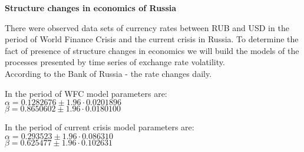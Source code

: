 \documentclass[12pt]{article}
\begin{document}
\begin{center}
\textbf{Structure changes in economics of Russia}
\end{center}

\bigskip
	There were observed data sets of currency rates between RUB and USD in the period of World Finance Crisis and the current crisis in Russia.
	To determine the fact of presence of structure changes in economics we will build the models of the processes presented by time series of exchange rate volatility.\\
	According to the Bank of Russia - the rate changes daily.
	
	In the period of WFC model parameters are:\\
	$\alpha = 0.1282676 \pm 1.96 \cdot 0.0201896$ \\
	$\beta = 0.8650602 \pm 1.96 \cdot 0.0180100$
	
	In the period of current crisis model parameters are:\\
	$\alpha = 0.293523 \pm 1.96 \cdot 0.086310$ \\
	$\beta =  0.625477 \pm 1.96 \cdot  0.102631$
\end{document}
